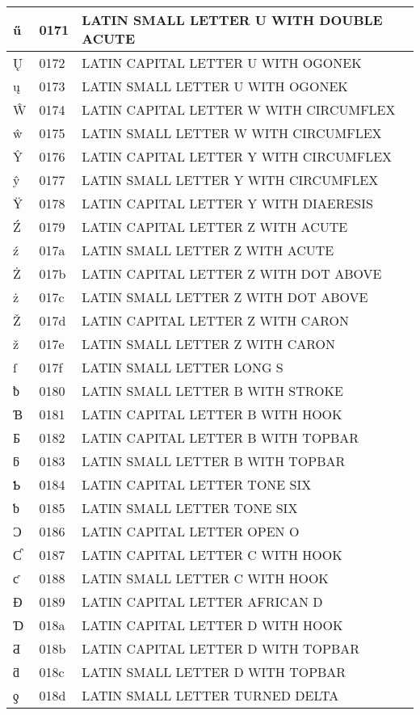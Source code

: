 \documentclass[12pt,letterpaper,openany]{book}
\begin{document}
\begin{center}
\begin{supertabular}{|m{0.25in}|m{0.5in}|m{4in}|}
ű & 0171 & LATIN SMALL LETTER U WITH DOUBLE ACUTE\\\hline
Ų & 0172 & LATIN CAPITAL LETTER U WITH OGONEK\\\hline
ų & 0173 & LATIN SMALL LETTER U WITH OGONEK\\\hline
Ŵ & 0174 & LATIN CAPITAL LETTER W WITH CIRCUMFLEX\\\hline
ŵ & 0175 & LATIN SMALL LETTER W WITH CIRCUMFLEX\\\hline
Ŷ & 0176 & LATIN CAPITAL LETTER Y WITH CIRCUMFLEX\\\hline
ŷ & 0177 & LATIN SMALL LETTER Y WITH CIRCUMFLEX\\\hline
Ÿ & 0178 & LATIN CAPITAL LETTER Y WITH DIAERESIS\\\hline
Ź & 0179 & LATIN CAPITAL LETTER Z WITH ACUTE\\\hline
ź & 017a & LATIN SMALL LETTER Z WITH ACUTE\\\hline
Ż & 017b & LATIN CAPITAL LETTER Z WITH DOT ABOVE\\\hline
ż & 017c & LATIN SMALL LETTER Z WITH DOT ABOVE\\\hline
Ž & 017d & LATIN CAPITAL LETTER Z WITH CARON\\\hline
ž & 017e & LATIN SMALL LETTER Z WITH CARON\\\hline
ſ & 017f & LATIN SMALL LETTER LONG S\\\hline
ƀ & 0180 & LATIN SMALL LETTER B WITH STROKE\\\hline
Ɓ & 0181 & LATIN CAPITAL LETTER B WITH HOOK\\\hline
Ƃ & 0182 & LATIN CAPITAL LETTER B WITH TOPBAR\\\hline
ƃ & 0183 & LATIN SMALL LETTER B WITH TOPBAR\\\hline
Ƅ & 0184 & LATIN CAPITAL LETTER TONE SIX\\\hline
ƅ & 0185 & LATIN SMALL LETTER TONE SIX\\\hline
Ɔ & 0186 & LATIN CAPITAL LETTER OPEN O\\\hline
Ƈ & 0187 & LATIN CAPITAL LETTER C WITH HOOK\\\hline
ƈ & 0188 & LATIN SMALL LETTER C WITH HOOK\\\hline
Ɖ & 0189 & LATIN CAPITAL LETTER AFRICAN D\\\hline
Ɗ & 018a & LATIN CAPITAL LETTER D WITH HOOK\\\hline
Ƌ & 018b & LATIN CAPITAL LETTER D WITH TOPBAR\\\hline
ƌ & 018c & LATIN SMALL LETTER D WITH TOPBAR\\\hline
ƍ & 018d & LATIN SMALL LETTER TURNED DELTA\\\hline

\end{supertabular}
\end{center}
\end{document}
